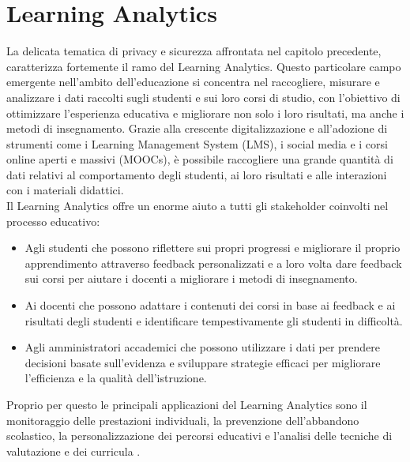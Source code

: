 \chapter{Learning Analytics}
La delicata tematica di privacy e sicurezza affrontata nel capitolo precedente, caratterizza fortemente il ramo
del Learning Analytics.
Questo particolare campo emergente nell'ambito dell'educazione si concentra nel raccogliere, misurare e analizzare i dati raccolti sugli studenti e sui loro corsi
di studio, con l'obiettivo di ottimizzare l'esperienza educativa e migliorare non solo i loro risultati, ma anche i metodi di insegnamento. Grazie alla crescente digitalizzazione e all'adozione di strumenti 
come i Learning Management System (LMS), i social media e i corsi online aperti e massivi (MOOCs), è possibile raccogliere una grande quantità di dati relativi al comportamento degli studenti, 
ai loro risultati e alle interazioni con i materiali didattici. 
\\Il Learning Analytics offre un enorme aiuto a tutti gli stakeholder coinvolti nel processo educativo:
\begin{itemize}
    \item Agli studenti che possono riflettere sui propri progressi e migliorare il proprio apprendimento attraverso feedback personalizzati e a loro volta dare feedback sui corsi per aiutare i docenti a migliorare i metodi di insegnamento.
    \item Ai docenti che possono adattare i contenuti dei corsi in base ai feedback e ai risultati degli studenti e identificare tempestivamente gli studenti in difficoltà.
    \item Agli amministratori accademici che possono utilizzare i dati per prendere decisioni basate sull'evidenza e sviluppare strategie efficaci per migliorare l'efficienza e la qualità dell'istruzione.
\end{itemize}
Proprio per questo le principali applicazioni del Learning Analytics sono il monitoraggio delle prestazioni individuali, la prevenzione dell'abbandono scolastico,
la personalizzazione dei percorsi educativi e l'analisi delle tecniche di valutazione e dei curricula \cite{wikipedia_learning_analytics}.

